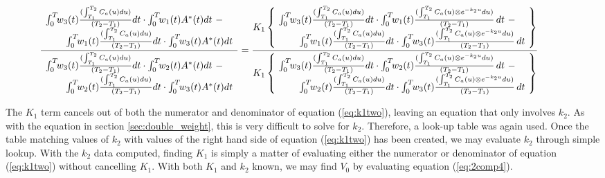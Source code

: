 %
\begin{equation}
\hspace*{-1.0cm}
\frac{
\begin{array}{lcr}
\multicolumn{2}{l}{
\int_{0}^{T}\!\!w_{3}(t) \frac{(\int_{T_1}^{T_2}C_{a}(u)du)}{(T_2 - T_1)} dt \cdot 
\int_{0}^{T}\!\!w_{1}(t)A^{*}(t)dt\,\,-}&\\
&\multicolumn{2}{r} {\int_{0}^{T}\!\!w_{1}(t)
\frac{(\int_{T_1}^{T_2}C_{a}(u)du)}{(T_2 - T_1)} dt \cdot
\int_{0}^{T}\!\!w_{3}(t)A^{*}(t)dt}\end{array}
}
{
\begin{array}{lcr}
\multicolumn{2}{l}
{\int_{0}^{T}\!\!w_{3}(t) \frac{(\int_{T_1}^{T_2}C_{a}(u)du)}{(T_2 - T_1)} dt \cdot 
\int_{0}^{T}\!\!w_{2}(t)A^{*}(t)dt\,\,-}&\\
&\multicolumn{2}{r}
{\int_{0}^{T}\!\!w_{2}(t) \frac{(\int_{T_1}^{T_2}C_{a}(u)du)}{(T_2 - T_1)} dt \cdot 
\int_{0}^{T}\!\!w_{3}(t)A^{*}(t)dt}\end{array}
}
 =
\frac{
K_{1} \left\{\!\!\!\! \begin{array}{c}
\begin{array}{lcr}\multicolumn{2}{l}
{\int_{0}^{T}\!\!w_{3}(t) \frac{(\int_{T_1}^{T_2}C_{a}(u)du)}{(T_2 -
T_1)} dt \cdot
\int_{0}^{T}\!\!w_{1}(t) \frac{(\int_{T_1}^{T_2}C_{a}(u) \otimes
e^{-k_{2}u} du)}{(T_2 - T_1)}\, dt\,\,-}&
\\ 
&\multicolumn{2}{r} {\int_{0}^{T}\!\!w_{1}(t)
\frac{(\int_{T_1}^{T_2}C_{a}(u)du)}{(T_2 - T_1)} dt \cdot
\int_{0}^{T}\!\!w_{3}(t)  \frac{(\int_{T_1}^{T_2}C_{a}(u) \otimes
e^{-k_{2}u} du)}{(T_2 - T_1)}\, dt}
\end{array} \end{array} \!\!\!\! \right\} }
{
K_{1} \left\{ \!\!\!\! \begin{array}{c}
\begin{array}{lcr} 
\multicolumn{2}{l}{\int_{0}^{T}\!\!w_{3}(t) \frac{(\int_{T_1}^{T_2}C_{a}(u)du)}{(T_2 - T_1)} dt \cdot 
\int_{0}^{T}\!\!w_{2}(t) \frac{(\int_{T_1}^{T_2}C_{a}(u) \otimes
e^{-k_{2}u} du)}{(T_2 - T_1)}\, dt\,\,-} &
\\
&\multicolumn{2}{r}{\int_{0}^{T}\!\!w_{2}(t)
\frac{(\int_{T_1}^{T_2}C_{a}(u)du)}{(T_2 - T_1)} dt \cdot
\int_{0}^{T}\!\!w_{3}(t)  \frac{(\int_{T_1}^{T_2}C_{a}(u) \otimes
e^{-k_{2}u} du)}{(T_2 - T_1)}\, dt} \end{array} \end{array} \!\!\!\!
\right\} }
\label{eq:k1two}
\end{equation}

The $K_{1}$ term cancels out of both the numerator and denominator of
equation (\ref{eq:k1two}), leaving an equation that only involves
$k_{2}$.  As with the equation in section \ref{sec:double_weight},
this is very difficult to solve for $k_{2}$.  Therefore, a look-up
table was again used.  Once the table matching values of $k_{2}$ with
values of the right hand side of equation (\ref{eq:k1two}) has been
created, we may evaluate $k_{2}$ through simple lookup.  With the
$k_{2}$ data computed, finding $K_{1}$ is simply a matter of
evaluating either the numerator or denominator of equation
(\ref{eq:k1two}) without cancelling $K_{1}$.  With both $K_{1}$ and
$k_{2}$ known, we may find $V_{0}$ by evaluating equation
(\ref{eq:2comp4}).

